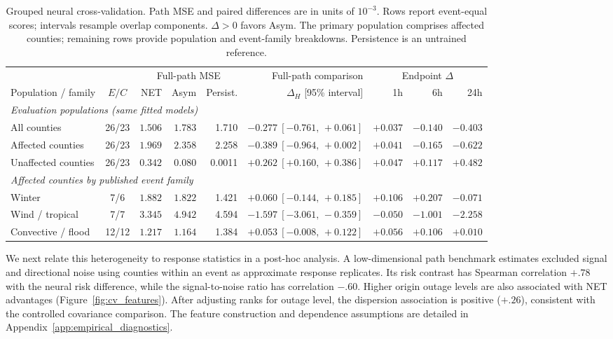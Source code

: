 \begin{table}[!t]
\centering
\caption{Grouped neural cross-validation. Path MSE and paired differences are in units of $10^{-3}$. Rows report event-equal scores; intervals resample overlap components. $\Delta>0$ favors Asym. The primary population comprises affected counties; remaining rows provide population and event-family breakdowns. Persistence is an untrained reference.}
\label{tab:real}
\begingroup\fontsize{8.8}{10.1}\selectfont\setlength{\tabcolsep}{3.0pt}
\begin{tabular}{l c rrr r rrr}
\toprule
& & \multicolumn{3}{c}{Full-path MSE} & Full-path comparison & \multicolumn{3}{c}{Endpoint $\Delta$}\\
\cmidrule(lr){3-5}\cmidrule(lr){7-9}
Population / family & $E/C$ & NET & Asym & Persist. & $\Delta_H$ [95\% interval] & 1h & 6h & 24h\\
\midrule
\multicolumn{9}{l}{\textit{Evaluation populations (same fitted models)}}\\[1pt]
All counties & 26/23 & $\mathbf{1.506}$ & $1.783$ & 1.710 & $-0.277\ [-0.761,\,+0.061]$ & $+0.037$ & $-0.140$ & $-0.403$\\
Affected counties & 26/23 & $\mathbf{1.969}$ & $2.358$ & 2.258 & $-0.389\ [-0.964,\,+0.002]$ & $+0.041$ & $-0.165$ & $-0.622$\\
Unaffected counties & 26/23 & $0.342$ & $\mathbf{0.080}$ & 0.0011 & $+0.262\ [+0.160,\,+0.386]$ & $+0.047$ & $+0.117$ & $+0.482$\\
\midrule\multicolumn{9}{l}{\textit{Affected counties by published event family}}\\[1pt]
Winter & 7/6 & $1.882$ & $\mathbf{1.822}$ & 1.421 & $+0.060\ [-0.144,\,+0.185]$ & $+0.106$ & $+0.207$ & $-0.071$\\
Wind / tropical & 7/7 & $\mathbf{3.345}$ & $4.942$ & 4.594 & $-1.597\ [-3.061,\,-0.359]$ & $-0.050$ & $-1.001$ & $-2.258$\\
Convective / flood & 12/12 & $1.217$ & $\mathbf{1.164}$ & 1.384 & $+0.053\ [-0.008,\,+0.122]$ & $+0.056$ & $+0.106$ & $+0.010$\\
\bottomrule\end{tabular}\endgroup
\end{table}

We next relate this heterogeneity to response statistics in a post-hoc analysis. A low-dimensional path benchmark estimates excluded signal and directional noise using counties within an event as approximate response replicates. Its risk contrast has Spearman correlation $+.78$ with the neural risk difference, while the signal-to-noise ratio has correlation $-.60$. Higher origin outage levels are also associated with NET advantages (Figure~\ref{fig:cv_features}). After adjusting ranks for outage level, the dispersion association is positive ($+.26$), consistent with the controlled covariance comparison. The feature construction and dependence assumptions are detailed in Appendix~\ref{app:empirical_diagnostics}.

